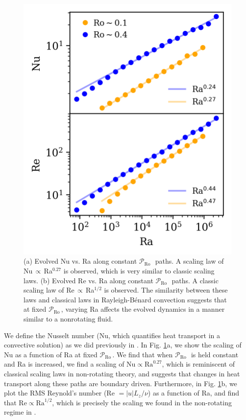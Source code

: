 \documentclass[twocolumn, amsmath, amsfonts, amssymb]{aastex62}
\newcommand{\RB}{Rayleigh-B\'{e}nard }
\newcommand{\pro}{\ensuremath{\mathcal{P}_{\text{Ro}}\,}}
\begin{document}
\begin{figure}[h]
\includegraphics{./figs/nu_and_re.png}
\caption{(a) Evolved Nu vs. Ra along constant
\pro$\,$ paths. A scaling law of Nu$\,\propto\,$Ra$^{0.27}$ is observed, which
is very similar to classic scaling laws.
(b) Evolved Re vs. Ra along constant \pro$\,$ paths.
A classic scaling law of Re$\,\propto\,$Ra$^{1/2}$ is observed. The
similarity between these laws and
classical laws in \RB convection suggests that at fixed \pro, varying Ra
affects the evolved dynamics in a manner similar to a nonrotating fluid.
\label{fig:nu_and_re} }
\end{figure}

We define the Nusselt number (Nu, which quantifies heat transport in a convective
solution) as we did previously in \AB.
In Fig. \ref{fig:nu_and_re}a, we show the scaling of Nu as a function
of Ra at fixed \pro. We find that when \pro$\,$ is held constant and
Ra is increased, we find a scaling of $\text{Nu} \propto \text{Ra}^{0.27}$,
which is reminiscent of classical scaling laws in non-rotating theory,
and suggests that changes in heat transport along these paths are boundary
driven. Furthermore, in Fig. \ref{fig:nu_and_re}b, we plot the RMS Reynold's
number (Re $= |u| L_z / \nu$) as a function of Ra, and find that 
$\text{Re} \propto \text{Ra}^{1/2}$, which is precisely the scaling we found
in the non-rotating regime in \AB.
\end{document}

